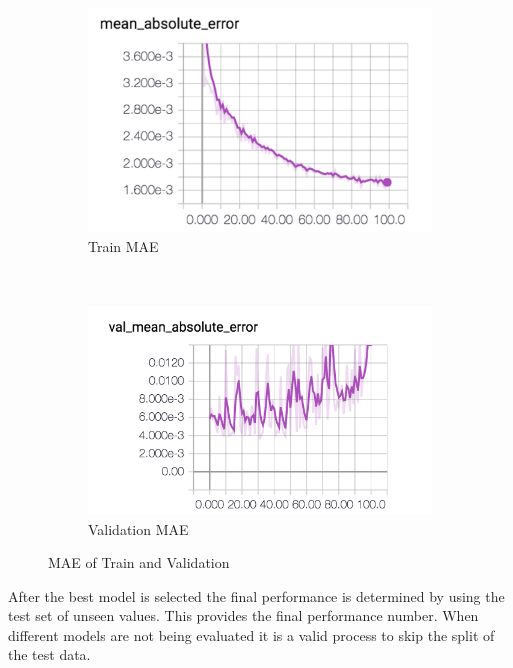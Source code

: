 \documentclass[11pt]{article}
\begin{document}
\begin{figure}
    \centering
    \begin{subfigure}[b]{0.3\textwidth}
        \includegraphics[width=\textwidth]{media/metric-test-val}
        \caption{Train MAE}
        \label{fig:train-mae}
    \end{subfigure}
    ~ %
    \begin{subfigure}[b]{0.3\textwidth}
        \includegraphics[width=\textwidth]{media/metric-test-val-mae}
        \caption{Validation MAE}
        \label{fig:val-mae}
    \end{subfigure}
    \caption{MAE of Train and Validation}
    \label{fig:metric-test-val}
\end{figure}


After the best model is selected the final performance is determined by using the test set of unseen values. This provides the final performance number. When different models are not being evaluated it is a valid process to skip the split of the test data.
\end{document}
